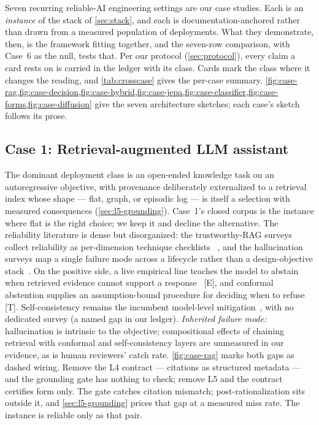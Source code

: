 
Seven recurring reliable-AI engineering settings are our case studies. Each is an \emph{instance}
of the stack of \cref{sec:stack}, and each is documentation-anchored
rather than drawn from a measured population of deployments. What they demonstrate, then, is
the framework fitting together, and the seven-row comparison, with Case~6 as the null, tests
that.
Per our protocol (\cref{sec:protocol}), every claim a card rests on is carried in the ledger
with its class. Cards mark the class where it changes the reading, and \cref{tab:crosscase}
gives the per-case summary.
\cref{fig:case-rag,fig:case-decision,fig:case-hybrid,fig:case-jepa,fig:case-classifier,fig:case-forms,fig:case-diffusion}
give the seven architecture sketches; each case's sketch follows its prose.

\subsection{Case 1: Retrieval-augmented LLM assistant}
\label{sec:case-rag}
The dominant deployment class is an open-ended knowledge task on an autoregressive objective,
with provenance deliberately externalized to a retrieval index whose shape --- flat, graph, or
episodic log --- is itself a selection with measured consequences (\cref{sec:l5-grounding}).
Case~1's closed corpus is the instance where flat is the
right choice; we keep it and decline the alternative. The reliability literature is
dense but disorganized: the trustworthy-RAG surveys collect reliability as per-dimension
technique checklists ~\cite{id250206872,id240910102}, and the hallucination surveys map a
single failure mode across a lifecycle rather than a design-objective
stack~\cite{id230901219,id251006265}. On the positive side, a live empirical line teaches the
model to abstain when retrieved evidence cannot support a response~\cite{id260935794} [E], and
conformal abstention supplies an assumption-bound procedure for deciding when to
refuse~\cite{id240501563} [T]. Self-consistency remains the incumbent model-level
mitigation~\cite{id220311171}, with no dedicated survey (a named gap in our ledger).
\emph{Inherited failure mode:} hallucination is intrinsic to the objective; compositional
effects of chaining retrieval with conformal and self-consistency layers are unmeasured in our
evidence, as is human reviewers' catch rate. \cref{fig:case-rag} marks both gaps as dashed
wiring. Remove the L4 contract --- citations as structured metadata --- and the grounding gate
has nothing to check; remove L5 and the contract certifies form only. The gate catches citation
mismatch; post-rationalization sits outside it, and \cref{sec:l5-grounding} prices that gap at a
measured miss rate. The instance is reliable only as that pair.


